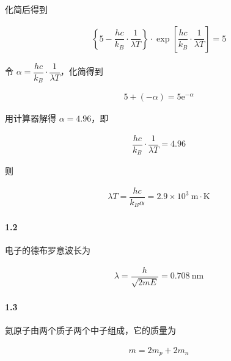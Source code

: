 \documentclass{article}
\newcommand*{\me}{\mathrm{e}}
\newcommand{\si}[1]{\  \mathrm{#1}}
\begin{document}
化简后得到

\begin{equation*}
  \begin{aligned}
    \left\{ 5 - \dfrac{hc}{k_B} \cdot \dfrac{1}{\lambda T}   \right\} \cdot \exp \left[ \dfrac{hc}{k_B} \cdot \dfrac{1}{\lambda T}   \right] = 5
  \end{aligned}
\end{equation*}

令 $\alpha = \dfrac{hc}{k_B} \cdot \dfrac{1}{\lambda T}  $，化简得到

\begin{equation*}
  \begin{aligned}
    5 + \left( - \alpha \right) = 5 \me^{-\alpha}
  \end{aligned}
\end{equation*}

用计算器解得 $\alpha = 4.96$，即

\begin{equation*}
  \begin{aligned}
    \dfrac{hc}{k_B} \cdot \dfrac{1}{\lambda T} = 4.96  
  \end{aligned}
\end{equation*}

则

\begin{equation*}
  \begin{aligned}
    \lambda T = \dfrac{h c}{k_B \alpha} = 2.9 \times 10^3 \si{m \cdot K} 
  \end{aligned}
\end{equation*}

\paragraph{1.2}

电子的德布罗意波长为

\begin{equation*}
  \begin{aligned}
    \lambda = \dfrac{h}{\sqrt{2 m E}} = 0.708 \si{nm} 
  \end{aligned}
\end{equation*}

\paragraph{1.3}

氦原子由两个质子两个中子组成，它的质量为

\begin{equation*}
  \begin{aligned}
    m = 2 m_p + 2 m_n
  \end{aligned}
\end{equation*}
\end{document}
